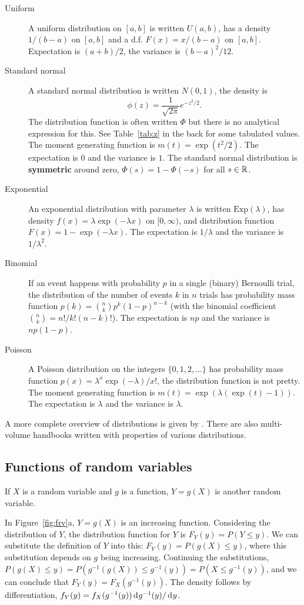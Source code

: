 \documentclass[twoside]{article}
\begin{document}
\begin{description}
\item[Uniform] A uniform distribution on $[a,b]$ is written $U(a,b)$, has a density $1/(b-a)$ on $[a,b]$ and 
a d.f. $F(x)=x/(b-a)$ on $[a,b]$. Expectation is $(a+b)/2$, the variance is $(b-a)^2/12$. 
\item[Standard normal] A standard normal distribution is written $N(0,1)$,  the density is 
\[ \phi(z) = \frac{1}{\sqrt{2\pi}} e^{-z^2/2}.\] The distribution function is often written $\Phi$ but
there is no analytical expression for this. See Table~\ref{tab:z} in the back for some tabulated values.
The moment generating function is $m(t) = \exp(t^2/2)$. The expectation is $0$ and the variance is $1$. The 
standard normal distribution is \textbf{symmetric} around zero, $\Phi(s)=1-\Phi(-s)$ for all $s\in\mathbb{R}$.
\item[Exponential] An exponential distribution with parameter $\lambda$ is written $\mathrm{Exp}(\lambda)$, 
has density $f(x)=\lambda \exp(-\lambda  x)$ on $[0,\infty)$, and distribution function $F(x)=1- \exp(-\lambda x)$.
The expectation is $1/\lambda$ and the variance is $1/\lambda^2$.
\item[Binomial] If an event happens with probability $p$ in a single (binary)
Bernoulli trial, the distribution of the number of events $k$ in $n$ trials has
probability mass function $p(k) = \binom{n}{k} p^k (1-p)^{n-k}$ (with the
binomial coefficient $\binom{n}{k} = n!/k!(n-k)!$). The expectation is $n p$ and the variance is $n p(1-p)$.
\item[Poisson] A Poisson distribution on the integers $\{0,1,2,\dots\}$ has probability mass function 
$p(x) = \lambda^x \exp(-\lambda)/x!$, the distribution function is not pretty. The moment generating function
is $m(t) = \exp(\lambda( \exp(t) -1))$. The expectation is $\lambda$ and the variance is $\lambda$.
\end{description}

A more complete overview of distributions is given by \citet{Leemis2008}. There are also multi-volume
handbooks written with properties of various distributions. 

\subsection{Functions of random variables}
If $X$ is a random variable and $g$ is a function, $Y=g(X)$ is another random variable.

In Figure~\ref{fig:frv}a, $Y=g(X)$ is an increasing function. 
Considering the distribution of $Y$, 
the distribution function for $Y$ is $F_Y(y) = P(Y\leq y)$. We can substitute
the definition of $Y$ into this: $F_Y(y) = P(g(X)\leq y)$, where this
substitution depends on $g$ being increasing. Continuing
the substitutions, $P(g(X) \leq y) = P( g^{-1}(g(X)) \leq g^{-1}(y)) = P(X\leq g^{-1}(y))$,
and we can conclude that $F_Y(y)= F_X(g^{-1}(y))$. The density follows by differentiation, 
$f_Y(y) = f_X(g^{-1}(y)) \rd g^{-1}(y)/\rd y$.
\end{document}

